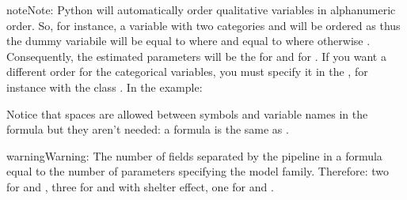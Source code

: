 \documentclass[letterpaper,10pt,english]{sphinxmanual}
\begin{document}
\begin{sphinxadmonition}{note}{Note:}
\sphinxAtStartPar
Python will automatically order qualitative variables in alphanumeric order. So, for
instance, a variable  with two categories  and  will be ordered as
\sphinxcode{\sphinxupquote{{[}"F", "M"{]}}} thus the dummy variabile will be equal to  where  and equal
to  where otherwise . Consequently, the estimated parameters will be the
 for  and  for . If you want a different order
for the categorical variables, you must specify it in the , for instance with the
 class . In the example:
\def\sphinxLiteralBlockLabel{\label{\detokenize{manual:id41}}}
\begin{sphinxVerbatim}[commandchars=\\\{\},numbers=left,firstnumber=1,stepnumber=1]
\PYG{p}{[}\PYG{p}{]}  
    \PYG{p}{[}\PYG{p}{]}
    \PYG{p}{[} \PYG{p}{]}
\end{sphinxVerbatim}
\end{sphinxadmonition}

\sphinxAtStartPar
Notice that spaces are allowed between symbols and variable names in the formula but they aren’t
needed: a formula  is the same as .

\begin{sphinxadmonition}{warning}{Warning:}
\sphinxAtStartPar
The number of fields separated by the pipeline \sphinxcode{\sphinxupquote{|}} in a formula  equal to
the number of parameters specifying the model family. Therefore: two for  and ,
three for  and  with shelter effect, one for  and .
\end{sphinxadmonition}
\end{document}
